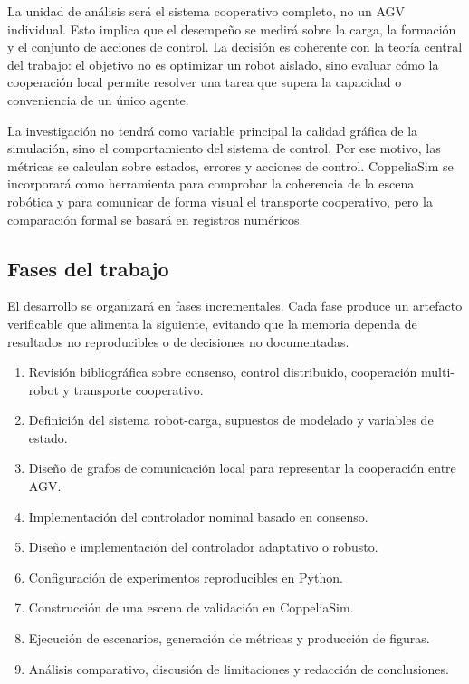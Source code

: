 \documentclass[12pt,a4paper]{article}
\begin{document}
La unidad de análisis será el sistema cooperativo completo, no un AGV individual. Esto implica que el desempeño se medirá sobre la carga, la formación y el conjunto de acciones de control. La decisión es coherente con la teoría central del trabajo: el objetivo no es optimizar un robot aislado, sino evaluar cómo la cooperación local permite resolver una tarea que supera la capacidad o conveniencia de un único agente.

La investigación no tendrá como variable principal la calidad gráfica de la simulación, sino el comportamiento del sistema de control. Por ese motivo, las métricas se calculan sobre estados, errores y acciones de control. CoppeliaSim se incorporará como herramienta para comprobar la coherencia de la escena robótica y para comunicar de forma visual el transporte cooperativo, pero la comparación formal se basará en registros numéricos.

\subsection{Fases del trabajo}

El desarrollo se organizará en fases incrementales. Cada fase produce un artefacto verificable que alimenta la siguiente, evitando que la memoria dependa de resultados no reproducibles o de decisiones no documentadas.

\begin{enumerate}
  \item Revisión bibliográfica sobre consenso, control distribuido, cooperación multi-robot y transporte cooperativo.
  \item Definición del sistema robot-carga, supuestos de modelado y variables de estado.
  \item Diseño de grafos de comunicación local para representar la cooperación entre AGV.
  \item Implementación del controlador nominal basado en consenso.
  \item Diseño e implementación del controlador adaptativo o robusto.
  \item Configuración de experimentos reproducibles en Python.
  \item Construcción de una escena de validación en CoppeliaSim.
  \item Ejecución de escenarios, generación de métricas y producción de figuras.
  \item Análisis comparativo, discusión de limitaciones y redacción de conclusiones.
\end{enumerate}
\end{document}
